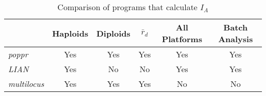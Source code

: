 \newpage

\begin{table*}
\caption{Comparison of programs that calculate $I_A$}
\label{table5}
\begin{tabular}{lccccc}
\hline
 & Haploids & Diploids & $\bar{r}_d$ & All Platforms & Batch Analysis \\
\hline 
\textit{poppr} & Yes & Yes & Yes & Yes & Yes \\
\textit{LIAN} & Yes & No & No & Yes & Yes \\
\textit{multilocus} & Yes & Yes & Yes & No & No \\ 
\hline
\end{tabular}
\end{table*}
